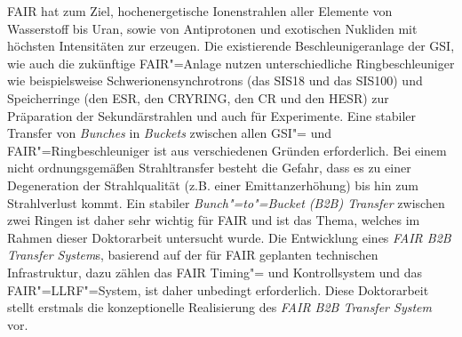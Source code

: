 FAIR hat zum Ziel, hochenergetische Ionenstrahlen aller Elemente von Wasserstoff bis Uran, sowie von Antiprotonen und exotischen Nukliden mit h\"ochsten  Intensit\"aten zur erzeugen. Die existierende Beschleunigeranlage der GSI, wie auch die zukünftige FAIR"=Anlage nutzen unterschiedliche Ringbeschleuniger wie beispielsweise Schwerionensynchrotrons (das SIS18 und das SIS100) und Speicherringe (den ESR, den CRYRING, den CR und den HESR) zur Pr\"aparation der Sekund\"arstrahlen und auch f\"ur Experimente.  Eine stabiler Transfer von \textit{Bunches} in \textit{Buckets} zwischen allen GSI"= und FAIR"=Ringbeschleuniger ist aus verschiedenen Gr\"unden erforderlich. Bei einem nicht ordnungsgem\"a\ss{}en Strahltransfer besteht die Gefahr, dass es zu einer Degeneration der Strahlqualit\"at (z.B.  einer Emittanzerh\"ohung) bis hin zum Strahlverlust kommt. Ein stabiler \textit{Bunch"=to"=Bucket (B2B) Transfer} zwischen zwei Ringen ist daher sehr wichtig f\"ur FAIR und ist das Thema, welches im Rahmen dieser Doktorarbeit untersucht wurde. Die Entwicklung eines \textit{FAIR B2B Transfer System}s, basierend auf der f\"ur FAIR geplanten technischen Infrastruktur, dazu z\"ahlen das FAIR Timing"= und Kontrollsystem und das FAIR"=LLRF"=System, ist daher unbedingt erforderlich. Diese Doktorarbeit stellt erstmals die konzeptionelle Realisierung des \textit{FAIR B2B Transfer System} vor. 



